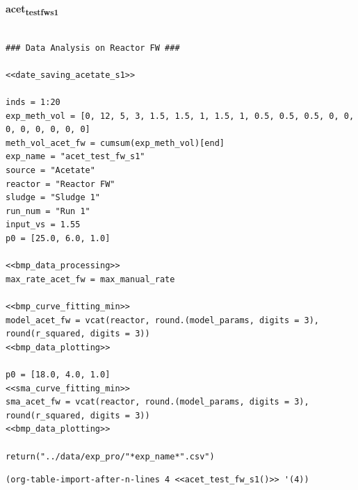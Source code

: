 \documentclass[11pt]{article}
\begin{document}
\textbf{acet\textsubscript{test}\textsubscript{fw}\textsubscript{s1}}
\begin{verbatim}

### Data Analysis on Reactor FW ###

<<date_saving_acetate_s1>>

inds = 1:20
exp_meth_vol = [0, 12, 5, 3, 1.5, 1.5, 1, 1.5, 1, 0.5, 0.5, 0.5, 0, 0, 0, 0, 0, 0, 0, 0]
meth_vol_acet_fw = cumsum(exp_meth_vol)[end]
exp_name = "acet_test_fw_s1"
source = "Acetate"
reactor = "Reactor FW"
sludge = "Sludge 1"
run_num = "Run 1"
input_vs = 1.55
p0 = [25.0, 6.0, 1.0]

<<bmp_data_processing>>
max_rate_acet_fw = max_manual_rate

<<bmp_curve_fitting_min>>
model_acet_fw = vcat(reactor, round.(model_params, digits = 3), round(r_squared, digits = 3))
<<bmp_data_plotting>>

p0 = [18.0, 4.0, 1.0]    
<<sma_curve_fitting_min>>
sma_acet_fw = vcat(reactor, round.(model_params, digits = 3), round(r_squared, digits = 3))  
<<bmp_data_plotting>>

return("../data/exp_pro/"*exp_name*".csv")
\end{verbatim}

\begin{verbatim}
(org-table-import-after-n-lines 4 <<acet_test_fw_s1()>> '(4))
\end{verbatim}
\end{document}
